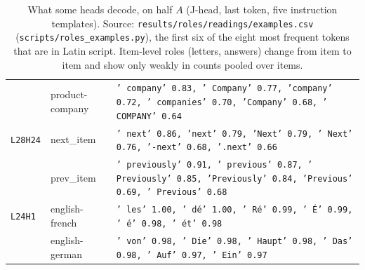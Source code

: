 \begin{table}[tbp]
\begin{tabularx}{\textwidth}{@{}llL@{}}
\texttt{} & product-company & \texttt{\small ' company' 0.83, ' Company' 0.77, 'company' 0.72, ' companies' 0.70, 'Company' 0.68, ' COMPANY' 0.64} \\
\texttt{L28H24} & next\_item & \texttt{\small ' next' 0.86, 'next' 0.79, 'Next' 0.79, ' Next' 0.76, '-next' 0.68, '.next' 0.66} \\
\texttt{} & prev\_item & \texttt{\small ' previously' 0.91, ' previous' 0.87, ' Previously' 0.85, 'Previously' 0.84, 'Previous' 0.69, ' Previous' 0.68} \\
\texttt{L24H1} & english-french & \texttt{\small ' les' 1.00, ' dé' 1.00, ' Ré' 0.99, ' É' 0.99, ' é' 0.98, ' ét' 0.98} \\
\texttt{} & english-german & \texttt{\small ' von' 0.98, ' Die' 0.98, ' Haupt' 0.98, ' Das' 0.98, ' Auf' 0.97, ' Ein' 0.97} \\
\bottomrule
\end{tabularx}
\caption{What some heads decode, on half $A$ (J-head, last token, five instruction templates). Source: \texttt{results/roles/readings/examples.csv} (\texttt{scripts/roles\_examples.py}), the first six of the eight most frequent tokens that are in Latin script. Item-level roles (letters, answers) change from item to item and show only weakly in counts pooled over items.}
\label{tab:examples}
\end{table}
